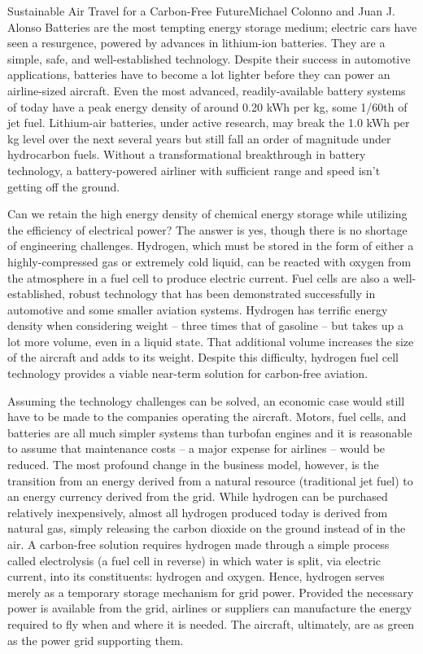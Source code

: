 \documentclass[10pt]{papertex}
\begin{document}
\begin{news}{2}{Sustainable Air Travel for a Carbon-Free Future}{Michael Colonno and Juan J. Alonso}{}{}
Batteries are the most tempting energy storage medium; electric cars have seen 
a resurgence, powered by advances in lithium-ion batteries. They are a simple, 
safe, and well-established technology. Despite their success in automotive 
applications, batteries have to become a lot lighter before they can power an 
airline-sized aircraft. Even the most advanced, readily-available battery 
systems of today have a peak energy density of around 0.20 kWh per kg, some 
1/60th of jet fuel. Lithium-air batteries, under active research, may break 
the 1.0 kWh per kg level over the next several years but still fall an order 
of magnitude under hydrocarbon fuels. Without a transformational breakthrough 
in battery technology, a battery-powered airliner with sufficient range and 
speed isn’t getting off the ground.


Can we retain the high energy density of chemical energy storage while 
utilizing the efficiency of electrical power? The answer is yes, though there 
is no shortage of engineering challenges. Hydrogen, which must be stored in 
the form of either a highly-compressed gas or extremely cold liquid, can be 
reacted with oxygen from the atmosphere in a fuel cell to produce electric 
current. Fuel cells are also a well-established, robust technology that has 
been demonstrated successfully in automotive and some smaller aviation systems. 
Hydrogen has terrific energy density when considering weight – three times 
that of gasoline – but takes up a lot more volume, even in a liquid state. 
That additional volume increases the size of the aircraft and adds to its 
weight. Despite this difficulty, hydrogen fuel cell technology provides a 
viable near-term solution for carbon-free aviation.


Assuming the technology challenges can be solved, an economic case would 
still have to be made to the companies operating the aircraft. Motors, fuel 
cells, and batteries are all much simpler systems than turbofan engines and 
it is reasonable to assume that maintenance costs – a major expense for 
airlines – would be reduced. The most profound change in the business model, 
however, is the transition from an energy derived from a natural resource 
(traditional jet fuel) to an energy currency derived from the grid. While 
hydrogen can be purchased relatively inexpensively, almost all hydrogen 
produced today is derived from natural gas, simply releasing the carbon 
dioxide on the ground instead of in the air. A carbon-free solution requires 
hydrogen made through a simple process called electrolysis (a fuel cell in 
reverse) in which water is split, via electric current, into its constituents: 
hydrogen and oxygen. Hence, hydrogen serves merely as a temporary storage 
mechanism for grid power. Provided the necessary power is available from the 
grid, airlines or suppliers can manufacture the energy required to fly when 
and where it is needed. The aircraft, ultimately, are as green as the power 
grid supporting them.


\end{news}
\end{document}
